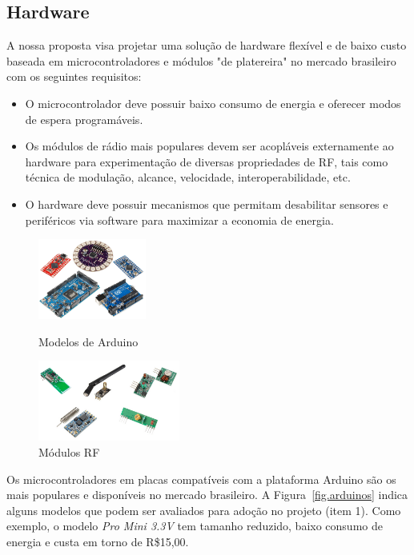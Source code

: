 \documentclass[titlepage,12pt]{article}
\begin{document}
\subsection{Hardware}

A nossa proposta visa projetar uma solução de hardware flexível e de baixo
custo baseada em microcontroladores e módulos "de platereira" no mercado
brasileiro com os seguintes requisitos:
%
\begin{itemize}
\item O microcontrolador deve possuir baixo consumo de energia e oferecer
      modos de espera programáveis.
\item Os módulos de rádio mais populares devem ser acopláveis externamente ao
      hardware para experimentação de diversas propriedades de RF, tais como
      técnica de modulação, alcance, velocidade, interoperabilidade, etc.
\item O hardware deve possuir mecanismos que permitam desabilitar sensores e
      periféricos via software para maximizar a economia de energia.
\end{itemize}

\begin{figure}
\begin{minipage}{0.50\textwidth}
\includegraphics[height=100px]{arduinos}
\caption{ Modelos de Arduino \label{fig.arduinos} }
\end{minipage}
\begin{minipage}{0.50\textwidth}
\includegraphics[height=100px]{rfs}
\caption{ Módulos RF \label{fig.rfs} }
\end{minipage}
\end{figure}

Os microcontroladores em placas compatíveis com a plataforma Arduino são os
mais populares e disponíveis no mercado brasileiro.
%
A Figura~\ref{fig.arduinos} indica alguns modelos que podem ser avaliados para
adoção no projeto (item 1).
%
Como exemplo, o modelo \emph{Pro Mini 3.3V} tem tamanho reduzido, baixo consumo
de energia e custa em torno de R\$15,00.
\end{document}

